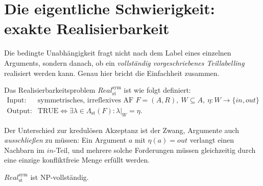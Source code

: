 \section{Die eigentliche Schwierigkeit: exakte Realisierbarkeit}
\label{sec:sym-realisierbarkeit}

Die bedingte Unabhängigkeit fragt nicht nach dem Label eines einzelnen
Arguments, sondern danach, ob ein \emph{vollständig vorgeschriebenes
Teillabelling} realisiert werden kann. Genau hier bricht die Einfachheit
zusammen.

\begin{Definition}
    \label{def:sym-real}
    Das Realisierbarkeitsproblem \(\textit{Real}^{\mathrm{sym}}_{\mathrm{st}}\)
    ist wie folgt definiert:
    \[
    \begin{array}{ll}
    \text{Input:}  & \text{symmetrisches, irreflexives AF } F=(A,R),\
                     W\subseteq A,\ \eta:W\to\{\mathit{in},\mathit{out}\}\\
    \text{Output:} & \text{TRUE} \Longleftrightarrow
                     \exists\lambda\in\Lambda_{\mathrm{st}}(F):\lambda|_W=\eta.
    \end{array}
    \]
\end{Definition}

Der Unterschied zur kredulösen Akzeptanz ist der Zwang, Argumente auch
\emph{ausschließen} zu müssen: Ein Argument \(a\) mit \(\eta(a)=\mathit{out}\)
verlangt einen Nachbarn im \(\mathit{in}\)-Teil, und mehrere solche Forderungen
müssen gleichzeitig durch eine einzige konfliktfreie Menge erfüllt werden.

\begin{Proposition}
    \label{prop:sym-real-npc}
    \(\textit{Real}^{\mathrm{sym}}_{\mathrm{st}}\) ist NP-vollständig.
\end{Proposition}

